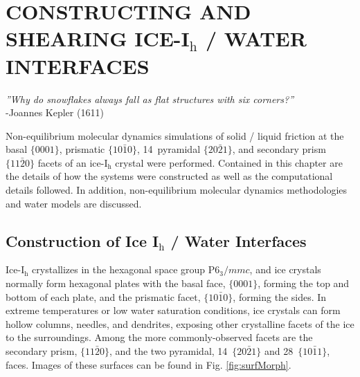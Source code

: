 

\chapter{CONSTRUCTING AND SHEARING ICE-I$_\mathrm{h}$ / WATER INTERFACES}

\begin{flushright}
\textit{''Why do snowflakes always fall as flat structures with six corners?''} \\
-Joannes Kepler (1611) \\
\end{flushright}


Non-equilibrium molecular dynamics simulations of solid / liquid
friction at the basal $\{0001\}$, prismatic $\{10\bar{1}0\}$,
14\degree~pyramidal $\{20\bar{2}1\}$, and secondary prism
$\{11\bar{2}0\}$ facets of an ice-I$_\mathrm{h}$ crystal were
performed. Contained in this chapter are the details of how the
systems were constructed as well as the computational details
followed. In addition, non-equilibrium molecular dynamics
methodologies and water models are discussed.


\section{Construction of Ice I$_\mathrm{h}$ / Water Interfaces}

Ice-I$_\mathrm{h}$ crystallizes in the hexagonal space group
P$6_3/mmc$, and ice crystals normally form hexagonal plates with the
basal face, $\{0001\}$, forming the top and bottom of each plate, and
the prismatic facet, $\{10\bar{1}0\}$, forming the sides.  In extreme
temperatures or low water saturation conditions, ice crystals can form
hollow columns, needles, and dendrites, exposing other crystalline
facets of the ice to the surroundings.  Among the more
commonly-observed facets are the secondary prism, $\{11\bar{2}0\}$,
and the two pyramidal, 14\degree~$\{20\bar{2}1\}$ and
28\degree~$\{10\bar{1}1\}$, faces. Images of these surfaces can
be found in Fig. \ref{fig:surfMorph}.


